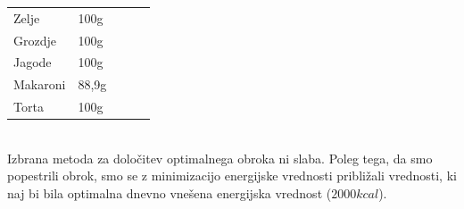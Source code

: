 \documentclass[slovene,11pt,a4paper]{article}
\numberwithin{equation}{section} %
\numberwithin{figure}{section} %
\numberwithin{table}{section} %
\begin{document}
\begin{table}[!h]
\begin{tabular}{|l|l|lll}
Zelje           & 100g  &                       &                                                  &                                 \\ \cline{1-2}
Grozdje         & 100g  &                       &                                                  &                                 \\ \cline{1-2}
Jagode          & 100g  &                       &                                                  &                                 \\ \cline{1-2}
Makaroni        & 88,9g &                       &                                                  &                                 \\ \cline{1-2}
Torta           & 100g  &                       &                                                  &                                 \\ \cline{1-2}
\end{tabular}
\end{table}
\\
Izbrana metoda za določitev optimalnega obroka ni slaba. Poleg tega, da smo popestrili obrok, smo se z minimizacijo energijske vrednosti približali vrednosti, ki naj bi bila optimalna dnevno vnešena energijska vrednost ($2000kcal$). 
\pagebreak
\end{document}
